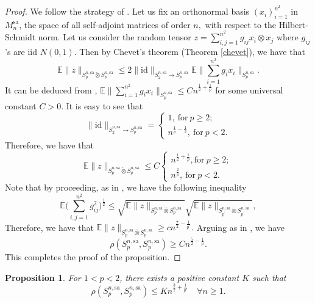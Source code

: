 \documentclass[a4paper,oneside,11pt, reqno]{amsart}
\numberwithin{equation}{section}
\newtheorem{proposition}[theorem]{Proposition}
\theoremstyle{plain}
\begin{document}
 \begin{proof}
     We follow the strategy of \cite[page 702]{XOR games and GT}. Let us fix an orthonormal basis $(x_i)_{i=1}^{n^2}$ in $M_n^{\text{sa}}$, the space of all self-adjoint matrices of order $n,$ with respect to the Hilbert-Schmidt norm. Let us consider the random tensor $z=\sum_{i,j=1}^{n^2}g_{ij}x_i\otimes x_j$ where $g_{ij}$'s are iid $N(0,1).$ Then by Chevet's theorem (Theorem \ref{chevet}), we have that 
     \[
\mathbb{E}\|z\|_{S_p^{n,\text{sa}}\check{\otimes}S_p^{n,\text{sa}}}\leqslant 2\|\text{id}\|_{S_2^{n,\text{sa}}\to S_p^{n,\text{sa}}}\mathbb{E}\Big\|\sum_{i=1}^{n^2}g_ix_i\Big\|_{S_p^{n,\text{sa}}}.
     \] 
     It can be deduced from \cite[Theorem 1.3]{Szarekcond}, $\mathbb{E}\Big\|\sum_{i=1}^{n^2}g_ix_i\Big\|_{S_p^{n,\text{sa}}}\leqslant C n^{\frac{1}{2}+\frac{1}{p}}$ for some universal constant $C>0$. It is easy to see that \[
        \|\text{id}\|_{S_2^{n,\text{sa}}\to S_p^{n,\text{sa}}} = \begin{cases}
                        1 , \ \text{for}\ p\geqslant 2; \\
                        n^{\frac{1}{p}-\frac{1}{2}}, \ \text{for}\ p<2.
                    \end{cases}
\]
Therefore, we have that 
    \[
       \mathbb{E}\|z\|_{S_p^{n,\text{sa}}\check{\otimes}S_p^{n,\text{sa}}}\leqslant C \begin{cases}
                        n^{\frac{1}{2}+\frac{1}{p}} , \text{for}\ p\geqslant 2; \\
                        n^{\frac{2}{p}}, \ \text{for}\ p<2.
                    \end{cases}
\]
     Note that by proceeding, as in \cite{XOR games and GT}, we have the following inequality
     \[\mathbb{E}\bigg(\sum_{i,j=1}^{n^2}g_{ij}^2\bigg)^{\frac{1}{2}}\leqslant \sqrt{\mathbb{E}\|z\|_{S_p^{n,\text{sa}}\hat{\otimes}S_p^{n,\text{sa}}}}\sqrt{\mathbb{E}\|z\|_{S_{p^\prime}^{n,\text{sa}}\check{\otimes}S_{p^\prime}^{n,\text{sa}}}},\] 
     Therefore, we have that $\mathbb E\|z\|_{S_p^{n,\text{sa}}\hat{\otimes} S_p^{n,\text{sa}}}\geqslant cn^{\frac{7}{2}-\frac{1}{p^\prime}}.$ Arguing as in \cite{XOR games and GT}, we have 
     \[\rho(S_p^{n,\text{sa}},S_p^{n,\text{sa}})\geqslant Cn^{\frac{5}{2}-\frac{1}{p}}.\]
     This completes the proof of the proposition.
 \end{proof}
 \begin{proposition}\label{leqnclp}
      For $1<p <2$, there exists a positive constant $K$ such that        $$\rho(S_p^{n,\text{sa}},S_p^{n,\text{sa}})\leqslant Kn^{\frac{3}{2}+\frac{1}{p'}} \quad \forall n\geqslant 1.$$ 
 \end{proposition}
\end{document}
